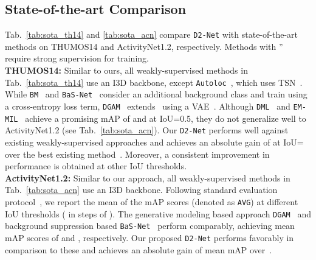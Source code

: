 \documentclass[final]{cvpr}
\def\proposed{\texttt{D2-Net}{}}
\begin{document}
\subsection{State-of-the-art Comparison \label{sec:sota_compare}}
Tab.~\ref{tab:sota_th14} and \ref{tab:sota_acn} compare \proposed{} with state-of-the-art methods on THUMOS14 and ActivityNet1.2, respectively. Methods with '' require strong supervision for training.\\
\noindent\textbf{THUMOS14:} 
Similar to ours, all weakly-supervised methods in Tab.~\ref{tab:sota_th14} use an I3D backbone, except \texttt{Autoloc}~\cite{autoloc}, which uses TSN~\cite{tsn}. While \texttt{BM}~\cite{bg-modeling} and \texttt{BaS-Net}~\cite{basnet} consider an additional background class and train using a cross-entropy loss term, \texttt{DGAM}~\cite{dgam} extends~\cite{bg-modeling} using a VAE~\cite{kingma13iclr}. Although \texttt{DML}~\cite{dml} and \texttt{EM-MIL}~\cite{luo2020emmil} achieve a promising mAP of  and  at IoU=0.5, they do not generalize well to ActivityNet1.2 (see Tab.~\ref{tab:sota_acn}). Our \proposed{} performs well against existing weakly-supervised approaches and achieves an absolute gain of  at IoU= over the best existing method~\cite{moniruzzaman2020action}. Moreover, a consistent improvement in performance is obtained at other IoU thresholds.\\
\noindent\textbf{ActivityNet1.2:} 
Similar to our approach, all weakly-supervised methods in Tab.~\ref{tab:sota_acn} use an I3D backbone. Following standard evaluation protocol~\cite{activitynet}, we report the mean of the mAP scores (denoted as \texttt{AVG}) at different IoU thresholds ( in steps of ). The generative modeling based approach \texttt{DGAM}~\cite{dgam} and background suppression based \texttt{BaS-Net}~\cite{basnet} perform comparably, achieving mean mAP scores of  and , respectively. Our proposed \proposed{} performs favorably in comparison to these and achieves an absolute gain of  mean mAP over~\cite{dgam}. 
\end{document}
